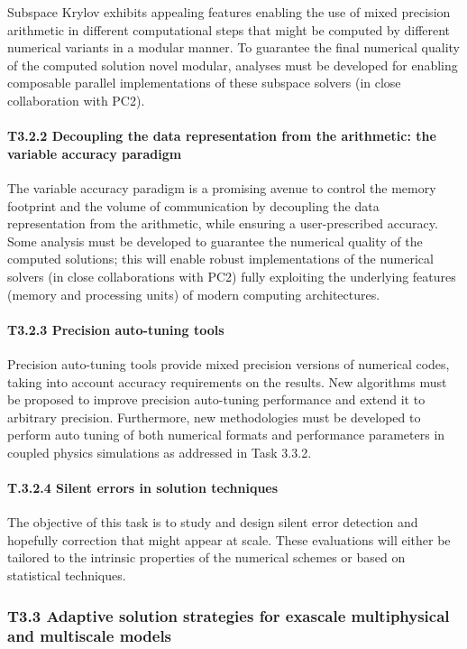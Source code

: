 Subspace Krylov exhibits appealing
features enabling the use of mixed precision arithmetic in different computational steps that might be
computed by different numerical variants in a modular manner. To guarantee the final numerical
quality of the computed solution novel modular, analyses must be developed for enabling composable
parallel implementations of these subspace solvers (in close collaboration with PC2).

\paragraph*{T3.2.2 Decoupling the data representation from the arithmetic: the variable accuracy paradigm}

The variable accuracy paradigm is a promising avenue to control the memory footprint and the
volume of communication by decoupling the data representation from the arithmetic, while ensuring a
user-prescribed accuracy. Some analysis must be developed to guarantee the numerical quality of the
computed solutions; this will enable robust implementations of the numerical solvers (in close
collaborations with PC2) fully exploiting the underlying features (memory and processing units) of
modern computing architectures.
\paragraph*{T3.2.3 Precision auto-tuning tools}
 Precision auto-tuning tools provide mixed precision versions of
numerical codes, taking into account accuracy requirements on the results. New algorithms must be
proposed to improve precision auto-tuning performance and extend it to arbitrary precision.
Furthermore, new methodologies must be developed to perform auto tuning of both numerical formats
and performance parameters in coupled physics simulations as addressed in Task 3.3.2.
\paragraph*{T.3.2.4 Silent errors in solution techniques}
 The objective of this task is to study and design silent
error detection and hopefully correction that might appear at scale. These evaluations will either be
tailored to the intrinsic properties of the numerical schemes or based on statistical techniques.

\subsubsection*{T3.3 Adaptive solution strategies for exascale multiphysical and multiscale models}
